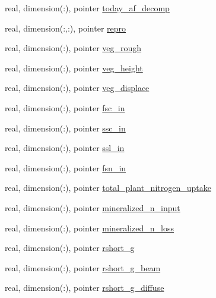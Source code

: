 \begin{DoxyCompactItemize}
\item 
real, dimension(\+:), pointer \hyperlink{structed__state__vars_1_1sitetype_ad28e5bc4802147d0c687329d96659f3c}{today\+\_\+af\+\_\+decomp}
\item 
real, dimension(\+:,\+:), pointer \hyperlink{structed__state__vars_1_1sitetype_a4ce72eca7ca4504f429975fe2f81a6cc}{repro}
\item 
real, dimension(\+:), pointer \hyperlink{structed__state__vars_1_1sitetype_aba6c50efac9f98d58ea029816316f5b1}{veg\+\_\+rough}
\item 
real, dimension(\+:), pointer \hyperlink{structed__state__vars_1_1sitetype_a9759bdb8aaf421a298c17d68d15b2116}{veg\+\_\+height}
\item 
real, dimension(\+:), pointer \hyperlink{structed__state__vars_1_1sitetype_a96402fc9b366af0d4b325f3902af94e4}{veg\+\_\+displace}
\item 
real, dimension(\+:), pointer \hyperlink{structed__state__vars_1_1sitetype_af2d7bf376f7fd1d1e3872c9dafcf8c92}{fsc\+\_\+in}
\item 
real, dimension(\+:), pointer \hyperlink{structed__state__vars_1_1sitetype_a590e48e26dc75c3dd8c8202105507fee}{ssc\+\_\+in}
\item 
real, dimension(\+:), pointer \hyperlink{structed__state__vars_1_1sitetype_a5b0c0a67ee904f1c1ab9f4a181d72912}{ssl\+\_\+in}
\item 
real, dimension(\+:), pointer \hyperlink{structed__state__vars_1_1sitetype_a884f3d23b14312f2db413e202d2cd53b}{fsn\+\_\+in}
\item 
real, dimension(\+:), pointer \hyperlink{structed__state__vars_1_1sitetype_a82b91babc2db9ff476240d27bc7d66f2}{total\+\_\+plant\+\_\+nitrogen\+\_\+uptake}
\item 
real, dimension(\+:), pointer \hyperlink{structed__state__vars_1_1sitetype_a0570266183e58862cfd40778b5e5bd46}{mineralized\+\_\+n\+\_\+input}
\item 
real, dimension(\+:), pointer \hyperlink{structed__state__vars_1_1sitetype_a3fe66b8fe99b0a423e23667cf3423127}{mineralized\+\_\+n\+\_\+loss}
\item 
real, dimension(\+:), pointer \hyperlink{structed__state__vars_1_1sitetype_a7fb4b90370805991e66b0a731ca74e05}{rshort\+\_\+g}
\item 
real, dimension(\+:), pointer \hyperlink{structed__state__vars_1_1sitetype_afe85ecc4fbe76fee6b56a3208c9ce02b}{rshort\+\_\+g\+\_\+beam}
\item 
real, dimension(\+:), pointer \hyperlink{structed__state__vars_1_1sitetype_a8e33cc2f570e3968b4a97bf36352dcee}{rshort\+\_\+g\+\_\+diffuse}

\end{DoxyCompactItemize}
